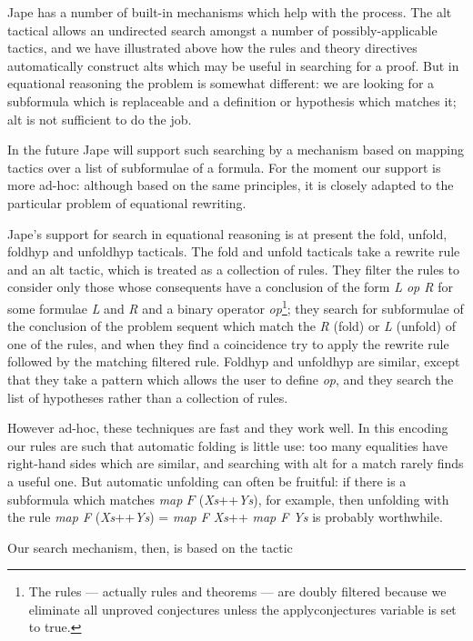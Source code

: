 Jape has a number of built-in mechanisms which help with the process. The alt tactical allows an undirected search amongst a number of possibly-applicable tactics, and we have illustrated above how the rules and theory directives automatically construct alts which may be useful in searching for a proof. But in equational reasoning the problem is somewhat different: we are looking for a subformula which is replaceable and a definition or hypothesis which matches it; alt is not sufficient to do the job.


In the future Jape will support such searching by a mechanism based on mapping tactics over a list of subformulae of a formula. For the moment our support is more ad-hoc: although based on the same principles, it is closely adapted to the particular problem of equational rewriting.


Jape's support for search in equational reasoning is at present the fold, unfold, foldhyp and unfoldhyp tacticals. The fold and unfold tacticals take a rewrite rule and an alt tactic, which is treated as a collection of rules. They filter the rules to consider only those whose consequents have a conclusion of the form \textit{L op R} for some formulae \textit{L} and \textit{R} and a binary operator \textit{op}\footnote{The rules --- actually rules and theorems --- are doubly filtered because we eliminate all unproved conjectures unless the applyconjectures variable is set to true.}; they search for subformulae of the conclusion of the problem sequent which match the \textit{R} (fold) or \textit{L} (unfold) of one of the rules, and when they find a coincidence try to apply the rewrite rule followed by the matching filtered rule. Foldhyp and unfoldhyp are similar, except that they take a pattern which allows the user to define \textit{op}, and they search the list of hypotheses rather than a collection of rules.


However ad-hoc, these techniques are fast and they work well. In this encoding our rules are such that automatic folding is little use: too many equalities have right-hand sides which are similar, and searching with alt for a match rarely finds a useful one. But automatic unfolding can often be fruitful: if there is a subformula which matches \textit{map} $F$ (\textit{Xs}++\textit{Ys}), for example, then unfolding with the rule \textit{map F} (\textit{Xs}++\textit{Ys}) = \textit{map F Xs}++ \textit{map F Ys} is probably worthwhile.


Our search mechanism, then, is based on the tactic

